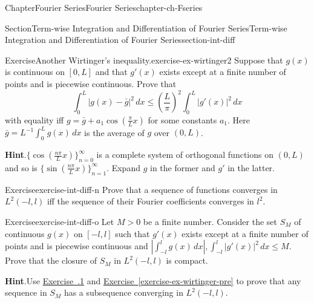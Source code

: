 \documentclass[oneside,10pt,]{book}
\newcommand{\blocktitlefont}{\relax}
\newcommand{\xreffont}{\relax}
\numberwithin{equation}{section}
\begin{document}
\begin{chapterptx}{Chapter}{Fourier Series}{}{Fourier Series}{}{}{chapter-ch-Fseries}
\begin{sectionptx}{Section}{Term-wise Integration and Differentiation of Fourier Series}{}{Term-wise Integration and Differentiation of Fourier Series}{}{}{section-int-diff}
\begin{inlineexercise}{Exercise}{Another Wirtinger's inequality.}{exercise-ex-wirtinger2}%
Suppose that  \(g(x)\) is continuous  on \([0, L]\) and that \(g'(x)\) exists except at a finite number of points and is piecewise continuous. Prove that%
\begin{equation}
\int_{0}^{L} |g(x)-\bar g|^{2} \, dx \le \left(\frac{L}{\pi}\right)^{2} \int_{0}^{L} |g'(x)|^{2} \, dx\label{men-eq-wirtinger2}
\end{equation}
with equality iff \(g=\bar g + a_{1}\cos \left(\frac{\pi}{L} x \right)\) for some constants \(a_{1}\). Here \(\bar g =L^{-1} \int_{0}^{L} g(x)\, dx\) is the average of \(g\) over \((0, L)\).%
\par\smallskip%
\noindent\textbf{\blocktitlefont Hint}.\hypertarget{hint-ex-wirtinger2-c}{}\quad{}\(\{ \cos \left(\frac{n\pi}{L} x \right) \}_{n=0}^{\infty}\) is a complete system of orthogonal functions on \((0, L)\) and so is \(\{ \sin \left(\frac{n\pi}{L} x \right) \}_{n=1}^{\infty}\). Expand \(g\) in the former and \(g'\) in the latter.\end{inlineexercise}%
\begin{inlineexercise}{Exercise}{}{exercise-int-diff-n}%
Prove that a sequence of functions converges in \(L^{2}(-l, l)\) iff the sequence of their Fourier coefficients converges in \(l^{2}\).%
\end{inlineexercise}%
\begin{inlineexercise}{Exercise}{}{exercise-int-diff-o}%
Let \(M > 0\) be a finite number. Consider the set \(S_{M}\) of continuous \(g(x)\) on \([-l, l]\) such that \(g'(x)\) exists except at a finite number of points and is piecewise continuous and \(\left| \int_{-l}^{l} g(x)\, dx\right|, \int_{-l}^{l} |g'(x)|^{2} \, dx \le M\). Prove that the closure of \(S_{M}\) in \(L^{2}(-l, l)\) is compact.%
\par\smallskip%
\noindent\textbf{\blocktitlefont Hint}.\hypertarget{hint-int-diff-o-b}{}\quad{}Use \hyperlink{exercise-lpcptset}{Exercise~{\xreffont 2.8.1}} and \hyperref[exercise-ex-wirtinger-pre]{Exercise~{\xreffont\ref{exercise-ex-wirtinger-pre}}} to prove that any sequence in \(S_{M}\) has a subsequence converging in \(L^{2}(-l, l)\).\end{inlineexercise}%
\end{sectionptx}
\end{chapterptx}
%
%
\typeout{************************************************}
\typeout{************************************************}
\end{document}
